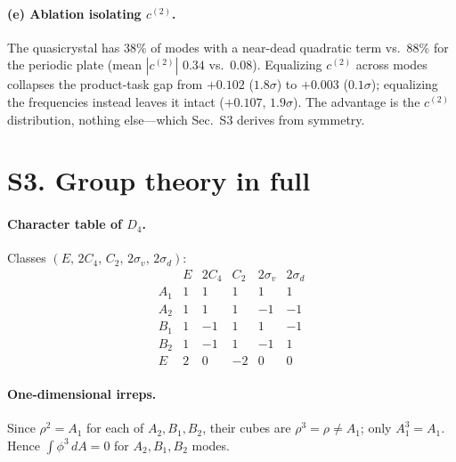 \documentclass[aps,prapplied,reprint,amsmath,amssymb,floatfix]{revtex4-2}
\begin{document}
\paragraph{(e) Ablation isolating $c^{(2)}$.}
The quasicrystal has $38\%$ of modes with a near-dead quadratic term vs.\ $88\%$
for the periodic plate (mean $|c^{(2)}|$ $0.34$ vs.\ $0.08$). Equalizing
$c^{(2)}$ across modes collapses the product-task gap from $+0.102$ ($1.8\sigma$)
to $+0.003$ ($0.1\sigma$); equalizing the frequencies instead leaves it intact
($+0.107$, $1.9\sigma$). The advantage is the $c^{(2)}$ distribution, nothing
else---which Sec.~S3 derives from symmetry.

\section{S3. Group theory in full}

\paragraph{Character table of $D_4$.} Classes
$(E,\,2C_4,\,C_2,\,2\sigma_v,\,2\sigma_d)$:
\begin{equation*}
\begin{array}{l|rrrrr}
        & E & 2C_4 & C_2 & 2\sigma_v & 2\sigma_d\\ \hline
A_1 & 1 & 1 & 1 & 1 & 1\\
A_2 & 1 & 1 & 1 & -1 & -1\\
B_1 & 1 & -1 & 1 & 1 & -1\\
B_2 & 1 & -1 & 1 & -1 & 1\\
E   & 2 & 0 & -2 & 0 & 0
\end{array}
\end{equation*}

\paragraph{One-dimensional irreps.} Since $\rho^2=A_1$ for each of
$A_2,B_1,B_2$, their cubes are $\rho^3=\rho\neq A_1$; only $A_1^3=A_1$. Hence
$\int\phi^3\,dA=0$ for $A_2,B_1,B_2$ modes.
\end{document}
